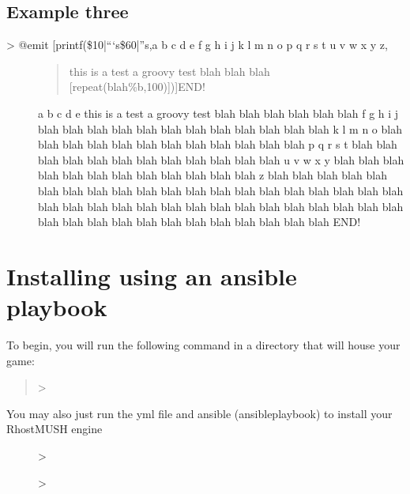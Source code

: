 \documentclass[letterpaper,10pt,english]{sphinxmanual}
\begin{document}
\section{Example three}
\label{\detokenize{21-printf:example-three}}\begin{description}
\item[{\textgreater{} @emit {[}printf(\$\sphinxhyphen{}10|“‘s\$\sphinxhyphen{}60|”s,a b c d e f g h i j k l m n o p q r s t u v w x y z,}] \leavevmode\begin{quote}

\sphinxAtStartPar
this is a test a groovy test blah blah blah {[}repeat(blah\%b,100){]}){]}END!
\end{quote}

\sphinxAtStartPar
a b c d e this is a test a groovy test blah blah blah blah blah blah
f g h i j blah blah blah blah blah blah blah blah blah blah blah blah
k l m n o blah blah blah blah blah blah blah blah blah blah blah blah
p q r s t blah blah blah blah blah blah blah blah blah blah blah blah
u v w x y blah blah blah blah blah blah blah blah blah blah blah blah
z         blah blah blah blah blah blah blah blah blah blah blah blah
blah blah blah blah blah blah blah blah blah blah blah blah blah blah
blah blah blah blah blah blah blah blah blah blah blah blah blah blah
blah blah blah blah blah blah blah                                    END!

\end{description}


\chapter{Installing using an ansible playbook}
\label{\detokenize{22-ansible:installing-using-an-ansible-playbook}}\label{\detokenize{22-ansible::doc}}
\sphinxAtStartPar
To begin, you will run the following command in a directory that will house your game:
\begin{quote}

\sphinxAtStartPar
\textgreater{} 
\end{quote}
\begin{description}
\item[{You may also just run the yml file and ansible (ansible\sphinxhyphen{}playbook) to install your RhostMUSH engine}] \leavevmode
\sphinxAtStartPar
\textgreater{} 

\sphinxAtStartPar
\textgreater{} 

\end{description}
\end{document}
